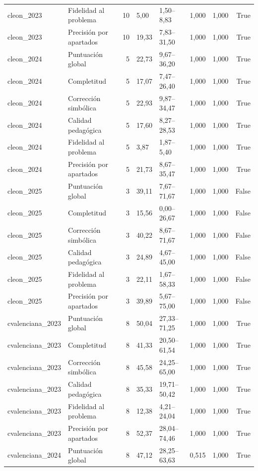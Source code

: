 \begin{tabular}{llrllllr}
cleon\_2023 & Fidelidad al problema & 10 & 5,00 & 1,50–8,83 & 1,000 & 1,000 & True \\
cleon\_2023 & Precisión por apartados & 10 & 19,33 & 7,83–31,50 & 1,000 & 1,000 & True \\
cleon\_2024 & Puntuación global & 5 & 22,73 & 9,67–36,20 & 1,000 & 1,000 & True \\
cleon\_2024 & Completitud & 5 & 17,07 & 7,47–26,40 & 1,000 & 1,000 & True \\
cleon\_2024 & Corrección simbólica & 5 & 22,93 & 9,87–34,47 & 1,000 & 1,000 & True \\
cleon\_2024 & Calidad pedagógica & 5 & 17,60 & 8,27–28,53 & 1,000 & 1,000 & True \\
cleon\_2024 & Fidelidad al problema & 5 & 3,87 & 1,87–5,40 & 1,000 & 1,000 & True \\
cleon\_2024 & Precisión por apartados & 5 & 21,73 & 8,67–35,47 & 1,000 & 1,000 & True \\
cleon\_2025 & Puntuación global & 3 & 39,11 & 7,67–71,67 & 1,000 & 1,000 & False \\
cleon\_2025 & Completitud & 3 & 15,56 & 0,00–26,67 & 1,000 & 1,000 & False \\
cleon\_2025 & Corrección simbólica & 3 & 40,22 & 8,67–71,67 & 1,000 & 1,000 & False \\
cleon\_2025 & Calidad pedagógica & 3 & 24,89 & 4,67–45,00 & 1,000 & 1,000 & False \\
cleon\_2025 & Fidelidad al problema & 3 & 22,11 & 1,67–58,33 & 1,000 & 1,000 & False \\
cleon\_2025 & Precisión por apartados & 3 & 39,89 & 5,67–75,00 & 1,000 & 1,000 & False \\
cvalenciana\_2023 & Puntuación global & 8 & 50,04 & 27,33–71,25 & 1,000 & 1,000 & True \\
cvalenciana\_2023 & Completitud & 8 & 41,33 & 20,50–61,54 & 1,000 & 1,000 & True \\
cvalenciana\_2023 & Corrección simbólica & 8 & 45,58 & 24,25–65,00 & 1,000 & 1,000 & True \\
cvalenciana\_2023 & Calidad pedagógica & 8 & 35,33 & 19,71–50,42 & 1,000 & 1,000 & True \\
cvalenciana\_2023 & Fidelidad al problema & 8 & 12,38 & 4,21–24,04 & 1,000 & 1,000 & True \\
cvalenciana\_2023 & Precisión por apartados & 8 & 52,37 & 28,04–74,46 & 1,000 & 1,000 & True \\
cvalenciana\_2024 & Puntuación global & 8 & 47,12 & 28,25–63,63 & 0,515 & 1,000 & True \\

\end{tabular}
